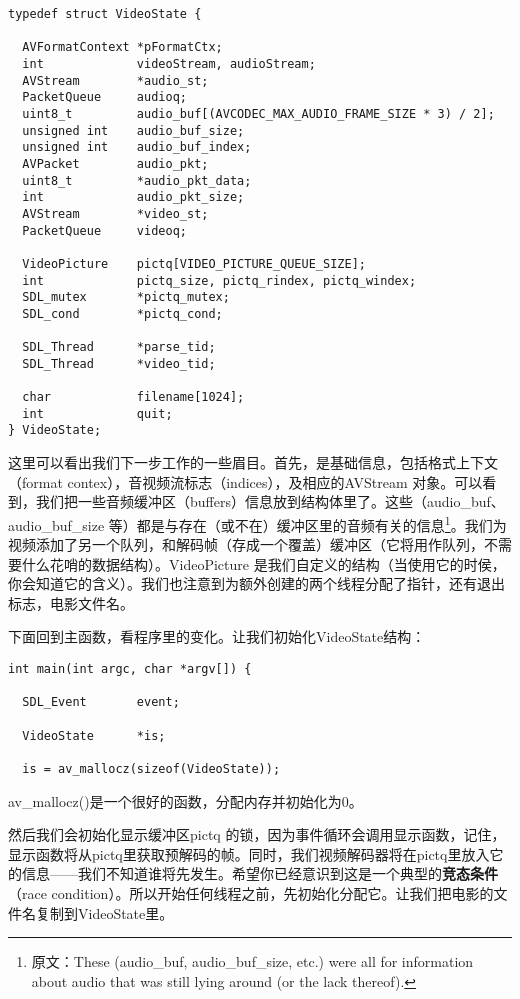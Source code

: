 \begin{lstlisting}
typedef struct VideoState {

  AVFormatContext *pFormatCtx;
  int             videoStream, audioStream;
  AVStream        *audio_st;
  PacketQueue     audioq;
  uint8_t         audio_buf[(AVCODEC_MAX_AUDIO_FRAME_SIZE * 3) / 2];
  unsigned int    audio_buf_size;
  unsigned int    audio_buf_index;
  AVPacket        audio_pkt;
  uint8_t         *audio_pkt_data;
  int             audio_pkt_size;
  AVStream        *video_st;
  PacketQueue     videoq;

  VideoPicture    pictq[VIDEO_PICTURE_QUEUE_SIZE];
  int             pictq_size, pictq_rindex, pictq_windex;
  SDL_mutex       *pictq_mutex;
  SDL_cond        *pictq_cond;

  SDL_Thread      *parse_tid;
  SDL_Thread      *video_tid;

  char            filename[1024];
  int             quit;
} VideoState;
\end{lstlisting}

这里可以看出我们下一步工作的一些眉目。首先，是基础信息，包括格式上下文（format contex），音视频流标志（indices），及相应的AVStream 对象。可以看到，我们把一些音频缓冲区（buffers）信息放到结构体里了。这些（audio_buf、 audio_buf_size 等）都是与存在（或不在）缓冲区里的音频有关的信息\footnote{原文：These (audio_buf, audio_buf_size, etc.) were all for information about audio that was still lying around (or the lack thereof).}。我们为视频添加了另一个队列，和解码帧（存成一个覆盖）缓冲区（它将用作队列，不需要什么花哨的数据结构）。VideoPicture 是我们自定义的结构（当使用它的时侯，你会知道它的含义）。我们也注意到为额外创建的两个线程分配了指针，还有退出标志，电影文件名。

下面回到主函数，看程序里的变化。让我们初始化VideoState结构：

\begin{lstlisting}
int main(int argc, char *argv[]) {

  SDL_Event       event;

  VideoState      *is;

  is = av_mallocz(sizeof(VideoState));
  \end{lstlisting}

av_mallocz()是一个很好的函数，分配内存并初始化为0。

然后我们会初始化显示缓冲区pictq 的锁，因为事件循环会调用显示函数，记住，显示函数将从pictq里获取预解码的帧。同时，我们视频解码器将在pictq里放入它的信息——我们不知道谁将先发生。希望你已经意识到这是一个典型的\textbf{竞态条件}（race condition）。所以开始任何线程之前，先初始化分配它。让我们把电影的文件名复制到VideoState里。

